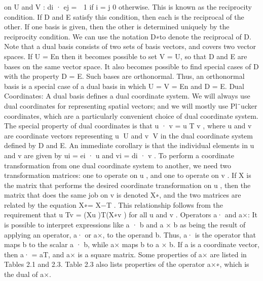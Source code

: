 on U and V : di · ej =  1 if i = j 0 otherwise. This is known as the reciprocity condition. If D and E satisfy this condition, then each is the reciprocal of the other. If one basis is given, then the other is determined uniquely by the reciprocity condition. We can use the notation D∗to denote the reciprocal of D. Note that a dual basis consists of two sets of basis vectors, and covers two vector spaces. If U = En then it becomes possible to set V = U, so that D and E are bases on the same vector space. It also becomes possible to find special cases of D with the property D = E. Such bases are orthonormal. Thus, an orthonormal basis is a special case of a dual basis in which U = V = En and D = E. Dual Coordinates: A dual basis defines a dual coordinate system. We will always use dual coordinates for representing spatial vectors; and we will mostly use Pl¨ucker coordinates, which are a particularly convenient choice of dual coordinate system. The special property of dual coordinates is that u · v = u T v , where u and v are coordinate vectors representing u ∈U and v ∈V in the dual coordinate system defined by D and E. An immediate corollary is that the individual elements in u and v are given by ui = ei · u and vi = di · v . To perform a coordinate transformation from one dual coordinate system to another, we need two transformation matrices: one to operate on u , and one to operate on v . If X is the matrix that performs the desired coordinate transformation on u , then the matrix that does the same job on v is denoted X∗, and the two matrices are related by the equation X∗= X−T . This relationship follows from the requirement that u Tv = (Xu )T(X∗v ) for all u and v . Operators a· and a×: It is possible to interpret expressions like a · b and a × b as being the result of applying an operator, a· or a×, to the operand b. Thus, a· is the operator that maps b to the scalar a · b, while a× maps b to a × b. If a is a coordinate vector, then a· = aT, and a× is a square matrix. Some properties of a× are listed in Tables 2.1 and 2.3. Table 2.3 also lists properties of the operator a×∗, which is the dual of a×.

